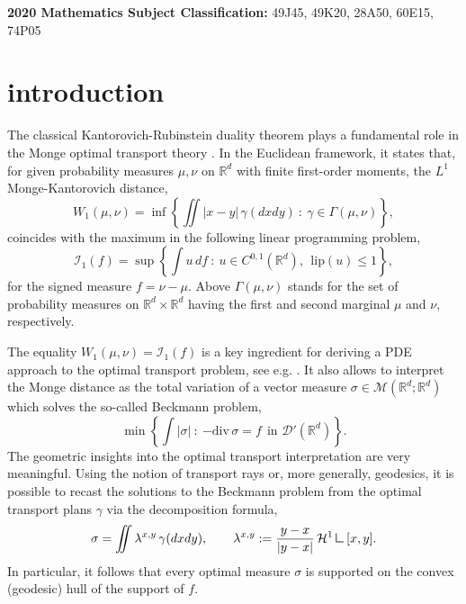 \documentclass[11pt,letterpaper,reqno]{amsart}
\theoremstyle{definition}
\numberwithin{equation}{section}
\newcommand{\R}{\mathbb{R}}
\newcommand{\Rd}{\R^d}
\newcommand{\Mes}{{\mathcal{M}}}
\newcommand{\dive}{{\mathrm{div}}}
\newcommand{\abs}[1]{{\left \lvert #1 \right \rvert}}
\newcommand{\Lip}{{\mathrm{lip}}}
\newcommand{\I}{\mathcal{I}}
\newcommand{\D}{\mathcal{D}}
\newcommand{\Ha}{\mathcal{H}}
\newcommand{\mres}{\mathbin{\vrule height 1.6ex depth 0pt width
		0.13ex\vrule height 0.13ex depth 0pt width 1.3ex}}
\begin{document}
\noindent \textbf{2020 Mathematics Subject Classification:}  49J45, 49K20, 28A50, 60E15, 74P05
	
	\dedicatory{}
	
	
	\maketitle
	
	
	\vskip1cm
	
	
\section{introduction}

The classical Kantorovich-Rubinstein duality theorem plays a fundamental role in the Monge optimal transport theory \cite{santambrogio2015,villani2003}.
In the Euclidean framework, it states that,  
for given probability measures $\mu, \nu$ on $\R^d$ with finite first-order moments, the $L^1$ Monge-Kantorovich distance,
$$ W_1(\mu,\nu) = \inf \left\{\iint |x-y|\, \gamma(dxdy) \ :\  \gamma\in \Gamma(\mu,\nu) \right\}, $$
coincides with the maximum in the following  linear programming problem,
\begin{equation}\label{firstorder} {\I_1(f)}= \sup\left\{  {\int u \, df }\ :\  u\in C^{0,1}(\R^d),\ \  \Lip(u)\le 1\right\} ,
\end{equation}
{for the signed measure $f=\nu -\mu$.} Above  $\Gamma(\mu,\nu)$ stands for the set of probability measures on
$\R^d\times \R^d$ having the first and second marginal $\mu$ and $\nu$, respectively. 

The equality $W_1(\mu,\nu)= {\I_1(f)}$ is a key ingredient for deriving a
  PDE approach to the optimal transport problem,  see e.g. \cite{BBS1997,evans1999}.  It also allows to interpret the Monge distance as the total variation of a vector measure $\sigma \in \Mes(\R^d;\R^d)$ which solves the so-called
Beckmann problem,
\begin{equation}
	\label{first-order_Beckmann}
	\min \left\{ \int |\sigma| \ :\  {-\dive\, \sigma= f}  \ \ \text{in } \D'(\Rd) \right\}.
\end{equation} 
The geometric insights into the optimal transport interpretation are
 very meaningful. Using the notion of transport rays or, more generally, geodesics, it is possible to  recast the solutions to the Beckmann problem from the optimal transport plans $\gamma$ via the decomposition formula,
\begin{equation} \label{truss-measure} \sigma = \iint \lambda^{x,y} \, \gamma(dxdy), \qquad  \lambda^{x,y}:=\frac{y-x}{\abs{y-x}}  \, \Ha^1 \mres [x,y].\end{equation}
 In particular, it follows that every optimal measure $\sigma$ is supported on the convex (geodesic) hull of the support of {$f$}.
 
\end{document}
